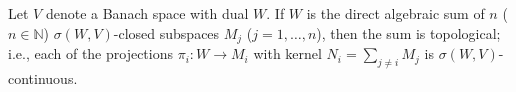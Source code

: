Let $V$ denote a Banach space with dual $W$. If $W$ is the direct algebraic sum of $n$ ($n \in \mathbb{N}$) $\sigma(W, V)$-closed subspaces $M_j$ ($j = 1, \ldots, n$), then the sum is topological; i.e., each of the projections $\pi_i : W \to M_i$ with kernel $N_i = \sum_{j \neq i} M_j$ is $\sigma(W, V)$-continuous.
